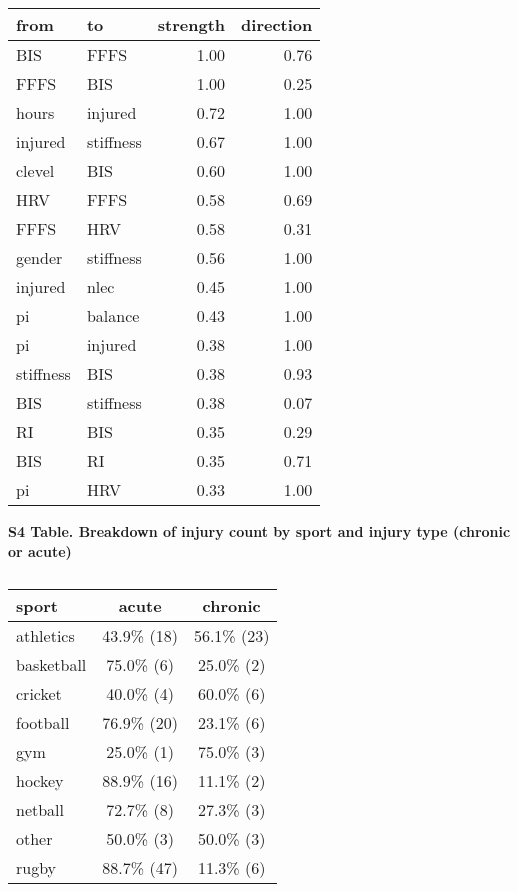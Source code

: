 \documentclass[
]{article}
\begin{document}
\begin{longtable}[t]{l|l|r|r}
\caption{\label{tab:unnamed-chunk-3}}\\
\hline
from & to & strength & direction\\
\hline
BIS & FFFS & 1.00 & 0.76\\
\hline
FFFS & BIS & 1.00 & 0.25\\
\hline
hours & injured & 0.72 & 1.00\\
\hline
injured & stiffness & 0.67 & 1.00\\
\hline
clevel & BIS & 0.60 & 1.00\\
\hline
HRV & FFFS & 0.58 & 0.69\\
\hline
FFFS & HRV & 0.58 & 0.31\\
\hline
gender & stiffness & 0.56 & 1.00\\
\hline
injured & nlec & 0.45 & 1.00\\
\hline
pi & balance & 0.43 & 1.00\\
\hline
pi & injured & 0.38 & 1.00\\
\hline
stiffness & BIS & 0.38 & 0.93\\
\hline
BIS & stiffness & 0.38 & 0.07\\
\hline
RI & BIS & 0.35 & 0.29\\
\hline
BIS & RI & 0.35 & 0.71\\
\hline
pi & HRV & 0.33 & 1.00\\
\hline
\end{longtable}

\newpage

\textbf{S4 Table. Breakdown of injury count by sport and injury type (chronic or acute)}

\begin{table}[H]

\caption{\label{tab:unnamed-chunk-4}}
\centering
\begin{tabular}[t]{l|c|c}
\hline
sport & acute & chronic\\
\hline
athletics & 43.9\% (18) & 56.1\% (23)\\
\hline
basketball & 75.0\%  (6) & 25.0\%  (2)\\
\hline
cricket & 40.0\%  (4) & 60.0\%  (6)\\
\hline
football & 76.9\% (20) & 23.1\%  (6)\\
\hline
gym & 25.0\%  (1) & 75.0\%  (3)\\
\hline
hockey & 88.9\% (16) & 11.1\%  (2)\\
\hline
netball & 72.7\%  (8) & 27.3\%  (3)\\
\hline
other & 50.0\%  (3) & 50.0\%  (3)\\
\hline
rugby & 88.7\% (47) & 11.3\%  (6)\\
\hline
\end{tabular}
\end{table}
\end{document}
